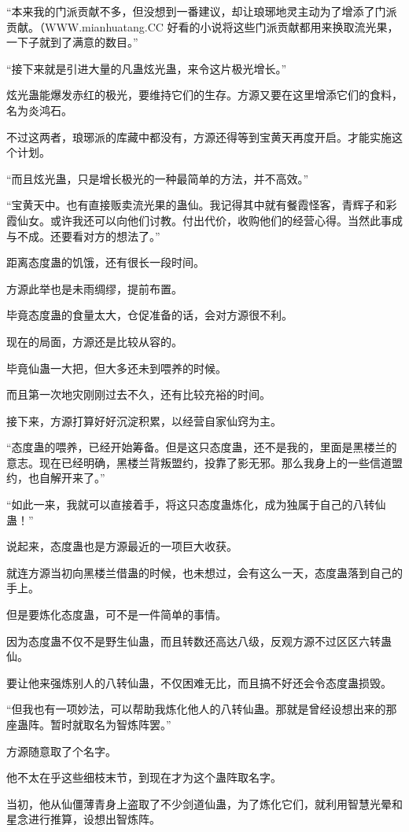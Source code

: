 \begin{this_body}
“本来我的门派贡献不多，但没想到一番建议，却让琅琊地灵主动为了增添了门派贡献。（WWW.mianhuatang.CC 好看的小说将这些门派贡献都用来换取流光果，一下子就到了满意的数目。”

“接下来就是引进大量的凡蛊炫光蛊，来令这片极光增长。”

炫光蛊能爆发赤红的极光，要维持它们的生存。方源又要在这里增添它们的食料，名为炎鸿石。

不过这两者，琅琊派的库藏中都没有，方源还得等到宝黄天再度开启。才能实施这个计划。

“而且炫光蛊，只是增长极光的一种最简单的方法，并不高效。”

“宝黄天中。也有直接贩卖流光果的蛊仙。我记得其中就有餐霞怪客，青辉子和彩霞仙女。或许我还可以向他们讨教。付出代价，收购他们的经营心得。当然此事成与不成。还要看对方的想法了。”

距离态度蛊的饥饿，还有很长一段时间。

方源此举也是未雨绸缪，提前布置。

毕竟态度蛊的食量太大，仓促准备的话，会对方源很不利。

现在的局面，方源还是比较从容的。

毕竟仙蛊一大把，但大多还未到喂养的时候。

而且第一次地灾刚刚过去不久，还有比较充裕的时间。

接下来，方源打算好好沉淀积累，以经营自家仙窍为主。

“态度蛊的喂养，已经开始筹备。但是这只态度蛊，还不是我的，里面是黑楼兰的意志。现在已经明确，黑楼兰背叛盟约，投靠了影无邪。那么我身上的一些信道盟约，也自解开来了。”

“如此一来，我就可以直接着手，将这只态度蛊炼化，成为独属于自己的八转仙蛊！”

说起来，态度蛊也是方源最近的一项巨大收获。

就连方源当初向黑楼兰借蛊的时候，也未想过，会有这么一天，态度蛊落到自己的手上。

但是要炼化态度蛊，可不是一件简单的事情。

因为态度蛊不仅不是野生仙蛊，而且转数还高达八级，反观方源不过区区六转蛊仙。

要让他来强炼别人的八转仙蛊，不仅困难无比，而且搞不好还会令态度蛊损毁。

“但我也有一项妙法，可以帮助我炼化他人的八转仙蛊。那就是曾经设想出来的那座蛊阵。暂时就取名为智炼阵罢。”

方源随意取了个名字。

他不太在乎这些细枝末节，到现在才为这个蛊阵取名字。

当初，他从仙僵薄青身上盗取了不少剑道仙蛊，为了炼化它们，就利用智慧光晕和星念进行推算，设想出智炼阵。


\end{this_body}
